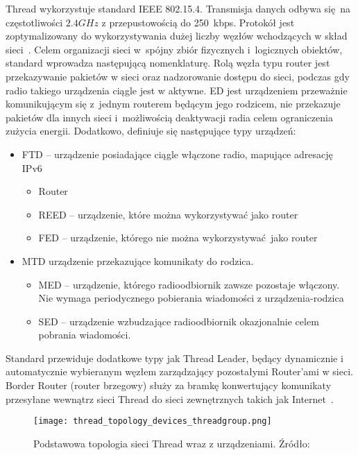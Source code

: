 Thread wykorzystuje standard IEEE 802.15.4. Transmisja danych odbywa się na częstotliwości $2.4GHz$ z przepustowością
do 250~kbps. Protokół jest zoptymalizowany do wykorzystywania dużej liczby węzłów wchodzących w skład sieci~\cite{silicon_laboratories_ug10311_2022}.
Celem organizacji sieci w~spójny zbiór fizycznych i~logicznych obiektów, standard wprowadza następującą nomenklaturę.
Rolą węzła typu router jest przekazywanie pakietów w sieci oraz nadzorowanie dostępu do sieci, podczas gdy radio
takiego urządzenia ciągle jest w aktywne. \gls{ED} jest urządzeniem przeważnie komunikującym się z~jednym
routerem będącym jego rodzicem, nie przekazuje pakietów dla innych sieci i~możliwością deaktywacji radia
celem ograniczenia zużycia energii. Dodatkowo, definiuje się następujące typy urządzeń:
\begin{itemize}
\item \gls{FTD} -- urządzenie posiadające ciągle włączone radio, mapujące adresację IPv6
	\begin{itemize}
	\item Router
	\item \gls{REED} -- urządzenie, które można wykorzystywać jako router
	\item \gls{FED} -- urządzenie, którego nie można wykorzystywać jako router
	\end{itemize}
\item \gls{MTD} urządzenie przekazujące komunikaty do rodzica.
	\begin{itemize}
	\item \gls{MED} -- urządzenie, którego radioodbiornik zawsze pozostaje włączony. Nie wymaga periodycznego
	pobierania wiadomości z urządzenia-rodzica
	\item \gls{SED} -- urządzenie wzbudzające radioodbiornik okazjonalnie celem pobrania wiadomości.
	\end{itemize}
\end{itemize}
Standard przewiduje dodatkowe typy jak Thread Leader, będący dynamicznie i automatycznie wybieranym węzłem
zarządzający pozostałymi Router'ami w sieci. Border Router (router brzegowy) służy za bramkę
konwertujący komunikaty przesyłane wewnątrz sieci Thread do sieci zewnętrznych takich jak Internet~\cite{noauthor_node_2022}.

\begin{figure}[!ht]
	\centering \texttt{[image: thread\_topology\_devices\_threadgroup.png]}
	\caption{Podstawowa topologia sieci Thread wraz z urządzeniami. Źródło:~\cite{thread_group_thread_2020}}
	\label{rys:thread_topology_devices_threadgroup}
\end{figure}

